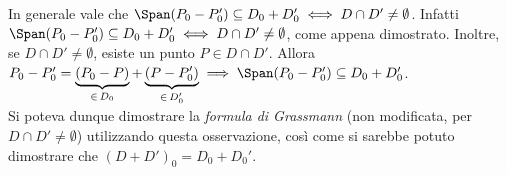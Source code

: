 \documentclass[11pt]{article}
\begin{document}
	\begin{remark}
		In generale vale che $\Span(P_0 - P_0') \subseteq D_0 + D_0' \iff
		D \cap D' \neq \emptyset$. Infatti $\Span(P_0 - P_0') \subseteq D_0 + D_0' \iff D \cap D' \neq \emptyset$, come appena dimostrato.
		Inoltre, se $D \cap D' \neq \emptyset$, esiste un punto
		$P \in D \cap D'$. Allora $P_0 - P_0' = \underbrace{(P_0 - P)}_{\in \, D_0} + \underbrace{(P - P_0')}_{\in \, D_0'} \implies \Span(P_0 - P_0') \subseteq D_0 + D_0'$. \\
		
		Si poteva dunque dimostrare la \textit{formula di Grassmann} (non
		modificata, per $D \cap D' \neq \emptyset$) utilizzando questa osservazione, così come si sarebbe
		potuto dimostrare che $(D + D')_0 = D_0 + D_0'$.
	\end{remark}
\end{document}
